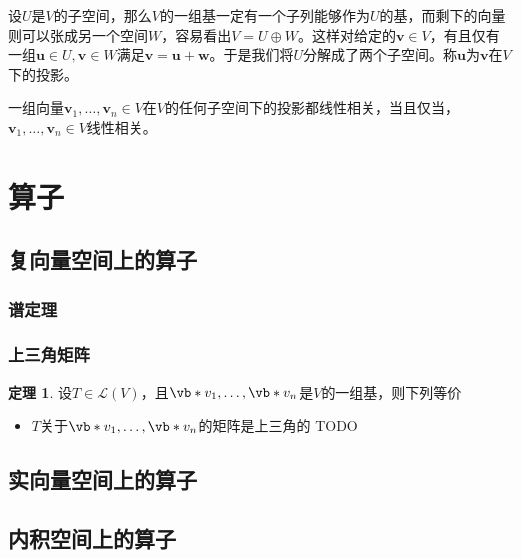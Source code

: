 \documentclass[UTF8]{ctexart}
\theoremstyle{definition}
\newtheorem{theorem}{\textbf{定理}}[section]
\begin{document}
设$U$是$V$的子空间，那么$V$的一组基一定有一个子列能够作为$U$的基，而剩下的向量则可以张成另一个空间$W$，容易看出$V=U \oplus W$。这样对给定的$\boldsymbol{v} \in V$，有且仅有一组$\boldsymbol{u}\in U, \boldsymbol{v} \in W$满足$\boldsymbol{v} = \boldsymbol{u} + \boldsymbol{w}$。于是我们将$U$分解成了两个子空间。称$\boldsymbol{u}$为$\boldsymbol{v}$在$V$下的投影。

一组向量$\boldsymbol{v}_1, \ldots, \boldsymbol{v}_n \in V$在$V$的任何子空间下的投影都线性相关，当且仅当，$\boldsymbol{v}_1, \ldots, \boldsymbol{v}_n \in V$线性相关。

\section{算子}

\subsection{复向量空间上的算子}

\subsubsection{谱定理}

\subsubsection{上三角矩阵}

\begin{theorem}
    设$T \in \mathcal{L}(V)$，且$\vb*{v}_1, \ldots, \vb*{v}_n$是$V$的一组基，则下列等价
    \begin{itemize}
        \item $T$关于$\vb*{v}_1, \ldots, \vb*{v}_n$的矩阵是上三角的
        TODO
    \end{itemize}
\end{theorem}

\subsection{实向量空间上的算子}

\subsection{内积空间上的算子}
\end{document}
